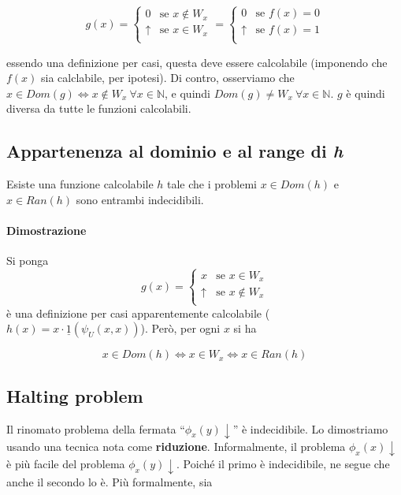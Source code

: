 $$
g(x)
= \begin{cases}
	0 &\text{se $x \notin W_x$}\\
	\uparrow &\text{se $x \in W_x$}\\
\end{cases}
= \begin{cases}
	0 &\text{se $f(x) = 0$}\\
	\uparrow &\text{se $f(x) = 1$}\\
\end{cases}
$$

essendo una definizione per casi, questa deve essere calcolabile (imponendo che $f(x)$ sia calclabile, per ipotesi). Di contro, osserviamo che $x \in Dom(g) \Leftrightarrow x \notin W_x \ \forall x \in \mathbb{N}$, e quindi $Dom(g) \neq W_x \ \forall x \in \mathbb{N}$. $g$ è quindi diversa da tutte le funzioni calcolabili.

\subsection{Appartenenza al dominio e al range di \textit{h}}
Esiste una funzione calcolabile $h$ tale che i problemi $x \in Dom(h)$ e $x \in Ran(h)$ sono entrambi indecidibili.

\paragraph{Dimostrazione}

Si ponga
$$
g(x)
= \begin{cases}
	x &\text{se $x \in W_x$}\\
	\uparrow &\text{se $x \notin W_x$}\\
\end{cases}
$$
%
è una definizione per casi apparentemente calcolabile ($h(x) = x \cdot \underline 1 (\psi_U(x,x))$). Però, per ogni $x$ si ha 

$$
x \in Dom(h) \Leftrightarrow x \in W_x \Leftrightarrow x \in Ran(h)
$$

\subsection{Halting problem}
Il rinomato problema della fermata ``$\phi_x(y)\downarrow$'' è indecidibile. Lo dimostriamo usando una tecnica nota come \textbf{riduzione}. Informalmente, il problema $\phi_x(x)\downarrow$ è più facile del problema $\phi_x(y)\downarrow$. Poiché il primo è indecidibile, ne segue che anche il secondo lo è. Più formalmente, sia

